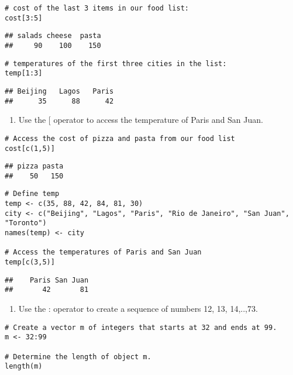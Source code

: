 \documentclass[
]{article}
\providecommand{\tightlist}{%
  \setlength{\itemsep}{0pt}\setlength{\parskip}{0pt}}
\begin{document}
\begin{verbatim}
# cost of the last 3 items in our food list:
cost[3:5]
\end{verbatim}

\begin{verbatim}
## salads cheese  pasta 
##     90    100    150
\end{verbatim}

\begin{verbatim}
# temperatures of the first three cities in the list:
temp[1:3]
\end{verbatim}

\begin{verbatim}
## Beijing   Lagos   Paris 
##      35      88      42
\end{verbatim}

\begin{enumerate}
\def\labelenumi{\arabic{enumi}.}
\setcounter{enumi}{4}
\tightlist
\item
  Use the {[} operator to access the temperature of Paris and San Juan.
\end{enumerate}

\begin{verbatim}
# Access the cost of pizza and pasta from our food list 
cost[c(1,5)]
\end{verbatim}

\begin{verbatim}
## pizza pasta 
##    50   150
\end{verbatim}

\begin{verbatim}
# Define temp
temp <- c(35, 88, 42, 84, 81, 30)
city <- c("Beijing", "Lagos", "Paris", "Rio de Janeiro", "San Juan", "Toronto")
names(temp) <- city

# Access the temperatures of Paris and San Juan
temp[c(3,5)]
\end{verbatim}

\begin{verbatim}
##    Paris San Juan 
##       42       81
\end{verbatim}

\begin{enumerate}
\def\labelenumi{\arabic{enumi}.}
\setcounter{enumi}{5}
\tightlist
\item
  Use the : operator to create a sequence of numbers 12, 13, 14,..,73.
\end{enumerate}

\begin{verbatim}
# Create a vector m of integers that starts at 32 and ends at 99.
m <- 32:99

# Determine the length of object m.
length(m)
\end{verbatim}
\end{document}
